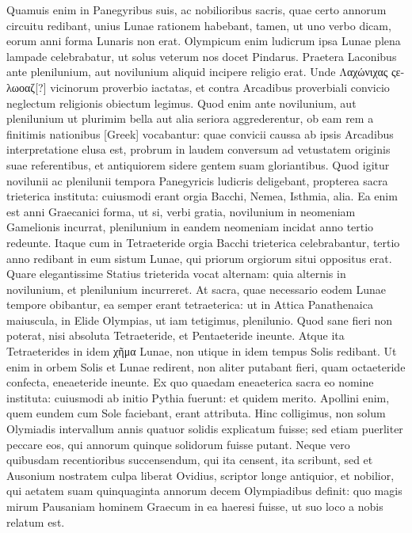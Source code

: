 Quamuis enim in
Panegyribus suis, ac nobilioribus sacris, quae certo annorum circuitu
redibant, unius Lunae rationem habebant, tamen, ut uno verbo
dicam, eorum anni forma Lunaris non erat.
Olympicum enim ludicrum
ipsa Lunae plena lampade celebrabatur, ut solus veterum nos
docet Pindarus. 
Praetera Laconibus ante plenilunium, aut novilunium
aliquid incipere religio erat.
Unde \textgreek{Λαχώνιχας ςελωοαζ}[?] vicinorum
proverbio iactatas, et contra Arcadibus proverbiali convicio
neglectum religionis obiectum legimus. 
Quod enim ante novilunium,
aut plenilunium ut plurimim bella aut alia seriora aggrederentur,
ob eam rem a finitimis nationibus \textgreek{[Greek]} vocabantur:
quae convicii caussa ab ipsis Arcadibus interpretatione elusa est,
probrum in laudem conversum ad vetustatem originis suae referentibus,
et antiquiorem sidere gentem suam gloriantibus. 
Quod igitur
novilunii ac plenilunii tempora Panegyricis ludicris deligebant,
propterea sacra trieterica instituta: cuiusmodi erant orgia Bacchi,
Nemea, Isthmia, alia.
Ea enim est anni Graecanici forma, ut si, verbi
gratia, novilunium in neomeniam Gamelionis incurrat, plenilunium
in eandem neomeniam incidat anno tertio redeunte.
Itaque
cum in Tetraeteride orgia Bacchi trieterica celebrabantur, tertio
anno redibant in eum sistum Lunae, qui priorum orgiorum situi oppositus
erat.
Quare elegantissime Statius trieterida vocat alternam:
quia alternis in novilunium, et plenilunium incurreret.
At sacra,
quae necessario eodem Lunae tempore obibantur, ea semper erant
tetraeterica: ut in Attica Panathenaica maiuscula, in Elide Olympias,
ut iam tetigimus, plenilunio.
\lnr{}Quod sane fieri non poterat, nisi absoluta
Tetraeteride, et Pentaeteride ineunte.
Atque ita Tetraeterides
in idem \textgreek{χῆμα} Lunae, non utique in idem tempus Solis redibant.
Ut
enim in orbem Solis et Lunae redirent, non aliter putabant fieri,
quam octaeteride confecta, eneaeteride ineunte.
Ex quo quaedam
eneaeterica sacra eo nomine instituta: cuiusmodi ab initio Pythia
fuerunt: et quidem merito.
Apollini enim, quem eundem cum Sole
faciebant, erant attributa.
Hinc colligimus, non solum Olymiadis
intervallum annis quatuor solidis explicatum fuisse; sed etiam puerliter
peccare eos, qui annorum quinque solidorum fuisse putant.
Neque vero quibusdam recentioribus succensendum, qui ita censent,
ita scribunt, sed et Ausonium nostratem culpa liberat Ovidius, scriptor
longe antiquior, et nobilior, qui aetatem suam quinquaginta annorum
decem Olympiadibus definit: quo magis mirum Pausaniam
hominem Graecum in ea haeresi fuisse, ut suo loco a nobis relatum est.


